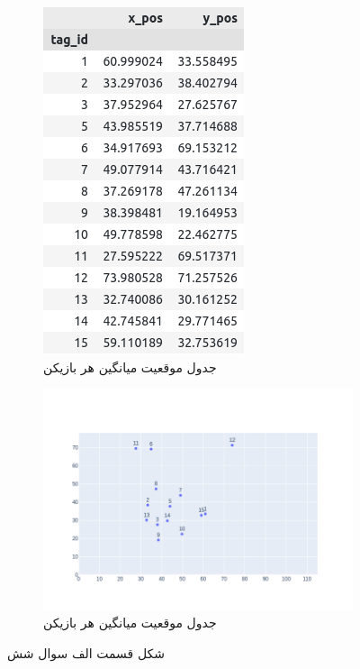 \documentclass[14pt,a4]{article}
\begin{document}
\begin{figure}[h]
    \begin{subfigure}{0.3\linewidth}
        \centering
        \includegraphics[scale=0.25]{images/q6/parta/table.png}
        \caption{جدول موقعیت میانگین هر بازیکن}
    \end{subfigure}
    \hfill
    \begin{subfigure}{0.65\linewidth}
        \centering
        \includegraphics[scale=0.3]{images/q6/parta/scatter.png}
        \caption{جدول موقعیت میانگین هر بازیکن}
    \end{subfigure}
    \caption{شکل قسمت الف سوال شش}
    \label{table-and-plot-of-the-mean-location}
\end{figure}
\end{document}
